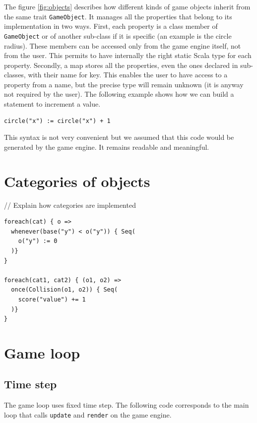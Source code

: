 \documentclass[11pt,a4paper]{article}
\begin{document}
The figure \ref{fig:objects} describes how different kinds of game objects inherit from the same trait \texttt{GameObject}. It manages all the properties that belong to its implementation in two ways. First, each property is a class member of \texttt{GameObject} or of another sub-class if it is specific (an example is the circle radius). These members can be accessed only from the game engine itself, not from the user. This permits to have internally the right static Scala type for each property. Secondly, a map stores all the properties, even the ones declared in sub-classes, with their name for key. This enables the user to have access to a property from a name, but the precise type will remain unknown (it is anyway not required by the user). The following example shows how we can build a statement to increment a value.

\begin{lstlisting}
circle("x") := circle("x") + 1
\end{lstlisting}

This syntax is not very convenient but we assumed that this code would be generated by the game engine. It remains readable and meaningful.


\section{Categories of objects}

// Explain how categories are implemented

\begin{lstlisting}
foreach(cat) { o =>
  whenever(base("y") < o("y")) { Seq(
    o("y") := 0
  )}
}

foreach(cat1, cat2) { (o1, o2) =>
  once(Collision(o1, o2)) { Seq(
    score("value") += 1
  )}  
}
\end{lstlisting}

\section{Game loop}

\subsection{Time step}
The game loop uses fixed time step. The following code corresponds to the main loop that calls \texttt{update} and \texttt{render} on the game engine.
\end{document}
